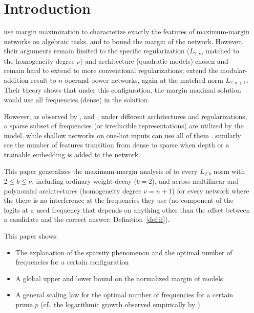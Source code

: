 \section{Introduction}\label{sec:intro}

\citet{morwani2024feature} use margin maximization \citep{wei2019regularization,lyu2020gradient} to characterize exactly the features of maximum-margin networks on algebraic tasks, and to bound the margin of the network. However, their arguments remain limited to the specific regularization ($L_{2, \nu}$, matched to the homogeneity degree $\nu$) and architecture (quadratic models) chosen and remain hard to extend to more conventional regularizations; \citet{li2025nsum} extend the modular-addition result to $n$-operand power networks, again at the matched norm $L_{2,n+1}$. Their theory shows that under this configuration, the margin maximal solution would use all frequencies (dense) in the solution.

However, as observed by \citet{nanda2023progress}, \citet{chughtai2023toy} and \citet{zhong2023clock}, under different architectures and regularizations, a sparse subset of frequencies (or irreducible representations) are utilized by the model, while shallow networks on one-hot inputs can use all of them \citep{morwani2024feature,mccracken2025}. \citet{mccracken2025} similarly see the number of features transition from dense to sparse when depth or a trainable embedding is added to the network.

This paper generalizes the maximum-margin analysis of \citet{morwani2024feature} to every $L_{2,b}$ norm with $2\le b\le\nu$, including ordinary weight decay ($b=2$), and across multilinear and polynomial architectures (homogeneity degree $\nu=n+1$) for every network where the there is no interference at the frequencies they use (no component of the logits at a used frequency that depends on anything other than the offset between a candidate and the correct answer; Definition~\ref{def:if}).

This paper shows:
\begin{itemize}[label={}]
  \item The explanation of the sparsity phenomenon and the optimal number of frequencies for a certain configuration
  \item A global upper and lower bound on the normalized margin of models
  \item A general scaling law for the optimal number of frequencies for a certain prime $p$ (cf.\ the logarithmic growth observed empirically by \citet{mccracken2025})
\end{itemize}